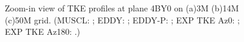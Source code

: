 \begin{figure}[t]
     \caption{Zoom-in view of TKE profiles at plane 4BY0 on (a)3M (b)14M (c)50M grid. (MUSCL: \mline; EDDY: \eline; EDDY-P: \epline; EXP TKE Az0: \bluediam; EXP TKE Az180: \reddiam.)}
     \label{ztke} 
\end{figure}
